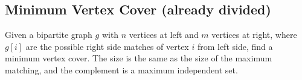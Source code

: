 \subsection{Minimum Vertex Cover (already divided)}

Given a bipartite graph $g$ with $n$ vertices at left and $m$ vertices at right, where $g[i]$ are the possible right side matches of vertex $i$ from left side, find a minimum vertex cover. The size is the same as the size of the maximum matching, and the complement is a maximum independent set.
